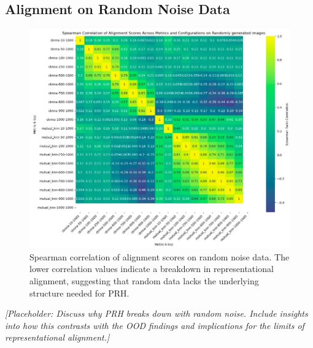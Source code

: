 \documentclass[10pt,a4paper]{article}
\begin{document}
\subsection{Alignment on Random Noise Data}
\begin{figure}[H]
    \centering
    \includegraphics[width=\textwidth]{prh_correlation_random.jpg}
    \caption{Spearman correlation of alignment scores on random noise data. The lower correlation values indicate a breakdown in representational alignment, suggesting that random data lacks the underlying structure needed for PRH.}
    \label{fig:prh_correlation_random}
\end{figure}

\textit{[Placeholder: Discuss why PRH breaks down with random noise. Include insights into how this contrasts with the OOD findings and implications for the limits of representational alignment.]}
\end{document}
